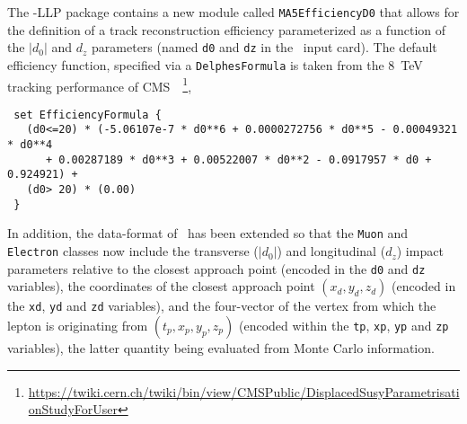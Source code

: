 The \DEL-LLP package contains a new module called \verb+MA5EfficiencyD0+ that
allows for the definition of a track reconstruction efficiency parameterized as a function of the $|d_0|$ and $d_z$ parameters (named \verb+d0+ and \verb+dz+ in the \DEL\ input
card). The default efficiency function, specified via a \verb+DelphesFormula+ is taken from the
8~TeV tracking performance of CMS~\cite{Khachatryan:2014mea}~\footnote{\url{https://twiki.cern.ch/twiki/bin/view/CMSPublic/DisplacedSusyParametrisationStudyForUser}},\\
\begin{verbatim}
 set EfficiencyFormula {
   (d0<=20) * (-5.06107e-7 * d0**6 + 0.0000272756 * d0**5 - 0.00049321 * d0**4
      + 0.00287189 * d0**3 + 0.00522007 * d0**2 - 0.0917957 * d0 +  0.924921) +
   (d0> 20) * (0.00)
 }
\end{verbatim}
In addition, the data-format of \DEL\ has been extended so that the \verb+Muon+ and
\verb+Electron+ classes now include the transverse ($|d_0|$) and longitudinal ($d_z$) impact parameters relative to the closest approach point (encoded
in the \verb+d0+ and \verb+dz+ variables), the coordinates of the closest
approach point $(x_d, y_d, z_d)$ (encoded in the \verb+xd+, \verb+yd+ and
\verb+zd+ variables), and the four-vector of the vertex from which the lepton is
originating from $(t_p, x_p, y_p, z_p)$ (encoded within the \verb+tp+,
\verb+xp+, \verb+yp+ and \verb+zp+ variables), the latter quantity being
evaluated from Monte Carlo information.

